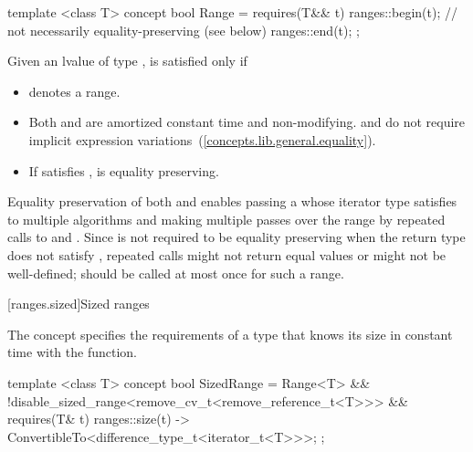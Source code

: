 \begin{itemdecl}
template <class T>
concept bool Range =
  requires(T&& t) {
    ranges::begin(t); // not necessarily equality-preserving (see below)
    ranges::end(t);
  };
\end{itemdecl}

\begin{itemdescr}

\pnum
Given an lvalue  of type ,  is satisfied
only if

\begin{itemize}
\item {} denotes a range.

\item Both  and  are amortized constant time
and non-modifying. \enternote {} and  do not require
implicit expression variations~(\ref{concepts.lib.general.equality}). \exitnote

\item If  satisfies ,
 is equality preserving.
\end{itemize}
\end{itemdescr}

\pnum \enternote
Equality preservation of both  and  enables passing a 
whose iterator type satisfies 
to multiple algorithms and
making multiple passes over the range by repeated calls to  and .
Since  is not required to be equality preserving when the return type does
not satisfy , repeated calls might not return equal values or
might not be well-defined;  should be called at most once for such a range.
\exitnote

[ranges.sized]{Sized ranges}

\pnum
The  concept specifies the requirements
of a  type that knows its size in constant time with the
 function.

\begin{itemdecl}
template <class T>
concept bool SizedRange =
  Range<T> &&
  !disable_sized_range<remove_cv_t<remove_reference_t<T>>> &&
  requires(T& t) {
    { ranges::size(t) } -> ConvertibleTo<difference_type_t<iterator_t<T>>>;
  };
\end{itemdecl}

